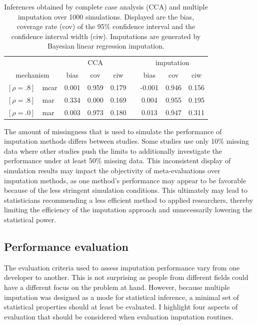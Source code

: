 \documentclass[12pt, a4paper]{article}
\begin{document}
\begin{table}[t]
\caption{Inferences obtained by complete case analysis (CCA) and multiple imputation over 1000 simulations. Displayed are the bias, coverage rate (cov) of the 95\% confidence interval and the confidence interval width (ciw). Imputations are generated by Bayesian linear regression imputation.}
\centering
\begin{tabular}{rlccccccc}
  \hline
 	& &\multicolumn{3}{c}{CCA} &&\multicolumn{3}{c}{imputation}	\\\cline{3-5}\cline{7-9}
 \multicolumn{2}{c}{mechanism}	& bias & cov & ciw && bias & cov & ciw \\ 
  \hline
  $[\rho = .8]$ &mcar & 0.001 & 0.959 & 0.179 && -0.001 & 0.946 & 0.156 \\ 
  $[\rho = .8]$ &mar & {\color{red} 0.334} & {\color{red} 0.000} & 0.169 && 0.004 & 0.955 & 0.195 \\ 
  $[\rho = .0]$ &mar & 0.003 & 0.973 &{\color{red} 0.180} && 0.013 & 0.947 & 0.311 \\    \hline
\end{tabular}
\label{tab:mis.mech}
\end{table}  

The amount of missingness that is used to simulate the performance of imputation methods differs between studies. Some studies use only 10\% missing data where other studies push the limits to additionally investigate the performance under at least 50\% missing data. This inconsistent display of simulation results may impact the objectivity of meta-evaluations over imputation methods, as one method's performance may appear to be favorable because of the less stringent simulation conditions. This ultimately may lead to statisticians recommending a less efficient method to applied researchers, thereby limiting the efficiency of the imputation approach and unnecessarily lowering the statistical power.

\subsection*{Performance evaluation}
The evaluation criteria used to assess imputation performance vary from one developer to another. This is not surprising as people from different fields could have a different focus on the problem at hand. However, because multiple imputation was designed as a mode for statistical inference, a minimal set of statistical properties should at least be evaluated. I highlight four aspects of evaluation that should be considered when evaluation imputation routines. 
\end{document}
